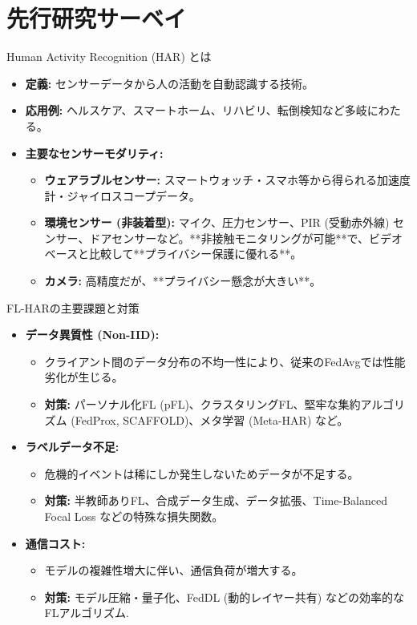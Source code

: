 \documentclass[unicode,12pt,aspectratio=169, dvipdfmx]{beamer}
\begin{document}
\section{先行研究サーベイ}

\begin{frame}{Human Activity Recognition (HAR) とは}
\begin{itemize}
    \item \textbf{定義:} センサーデータから人の活動を自動認識する技術。
    \item \textbf{応用例:} ヘルスケア、スマートホーム、リハビリ、転倒検知など多岐にわたる。
    \item \textbf{主要なセンサーモダリティ:}
    \begin{itemize}
        \item \textbf{ウェアラブルセンサー:} スマートウォッチ・スマホ等から得られる加速度計・ジャイロスコープデータ。
        \item \textbf{環境センサー (非装着型):} マイク、圧力センサー、PIR (受動赤外線) センサー、ドアセンサーなど。**非接触モニタリングが可能**で、ビデオベースと比較して**プライバシー保護に優れる**。
        \item \textbf{カメラ:} 高精度だが、**プライバシー懸念が大きい**。
    \end{itemize}
\end{itemize}
\end{frame}

\begin{frame}{FL-HARの主要課題と対策}
\begin{itemize}
    \item \textbf{データ異質性 (Non-IID):}
    \begin{itemize}
        \item クライアント間のデータ分布の不均一性により、従来のFedAvgでは性能劣化が生じる。
        \item \textbf{対策:} パーソナル化FL (pFL)、クラスタリングFL、堅牢な集約アルゴリズム (FedProx, SCAFFOLD)、メタ学習 (Meta-HAR) など。
    \end{itemize}
    \item \textbf{ラベルデータ不足:}
    \begin{itemize}
        \item 危機的イベントは稀にしか発生しないためデータが不足する。
        \item \textbf{対策:} 半教師ありFL、合成データ生成、データ拡張、Time-Balanced Focal Loss などの特殊な損失関数。
    \end{itemize}
    \item \textbf{通信コスト:}
    \begin{itemize}
        \item モデルの複雑性増大に伴い、通信負荷が増大する。
        \item \textbf{対策:} モデル圧縮・量子化、FedDL (動的レイヤー共有) などの効率的なFLアルゴリズム.
    \end{itemize}
\end{itemize}
\end{frame}
\end{document}
